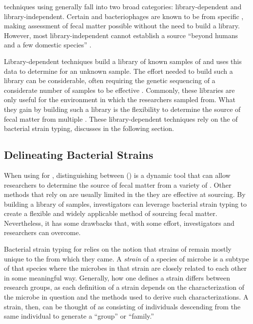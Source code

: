 \mst{} techniques using \fib{} generally fall into two broad categories: library-dependent and library-independent.
Certain \fib{} and bacteriophages are known to be from specific \spec{}, making \spec{} assessment of fecal matter possible without the need to build a library.
However, most library-independent \mst{} cannot establish a \spec{} source ``beyond humans and a few domestic species'' \cite{rogers2005detecting}.

Library-dependent techniques build a library of known \spec{} samples of \fib{} and uses this data to determine \spec{} for an unknown sample.
The effort needed to build such a library can be considerable, often requiring the genetic sequencing of a considerate number of samples to be effective \cite{rogers2005detecting}.
Commonly, these libraries are only useful for the environment in which the researchers sampled from.
What they gain by building such a library is the flexibility to determine the source of fecal matter from multiple \spec{} \cite{rogers2005detecting}.
These library-dependent techniques rely on the of bacterial strain typing, discusses in the following section.


\subsection{Delineating Bacterial Strains}
When using \fib{} for \mst{}, distinguishing between \bslongs{} (\bs{}) is a dynamic tool that can allow researchers to determine the source of fecal matter from a variety of \spec{}.
Other methods that rely on \mst{} are usually limited in the \spec{} they are effective at sourcing.
By building a library of \fib{} samples, investigators can leverage bacterial strain typing to create a flexible and widely applicable method of sourcing fecal matter.
Nevertheless, it has some drawbacks that, with some effort, \mst{} investigators and researchers can overcome.

Bacterial strain typing for \mst{} relies on the notion that strains of \fib{} remain mostly unique to the \spec{} from which they came.
A \textit{strain} of a species of microbe is a subtype of that species where the microbes in that strain are closely related to each other in some meaningful way. 
Generally, how one defines a strain differs between research groups, as each definition of a strain depends on the characterization of the microbe in question and the methods used to derive such characterizations.
A strain, then, can be thought of as consisting of individuals descending from the same individual to generate a ``group'' or ``family.''

